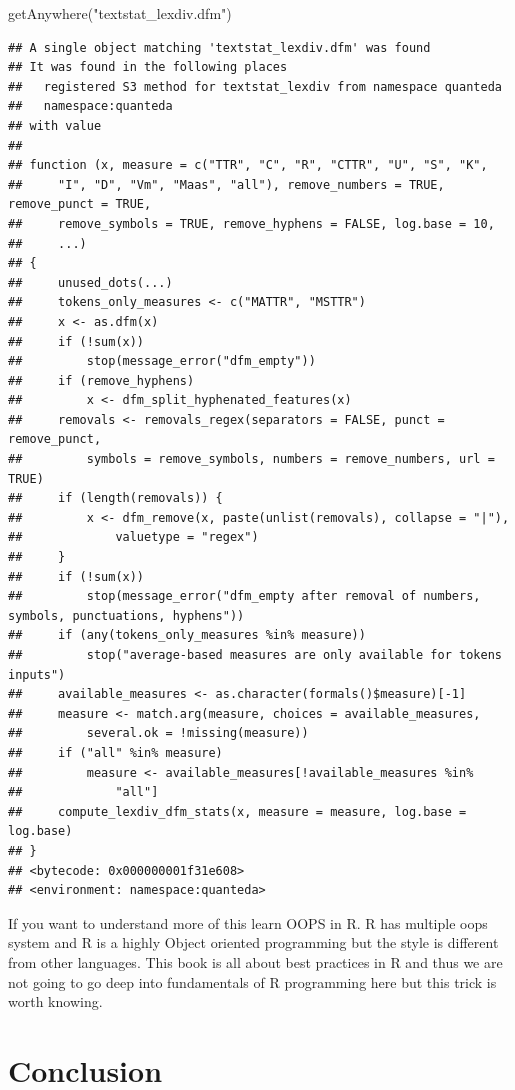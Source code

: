 \documentclass[
]{book}
\newenvironment{Shaded}{\begin{snugshade}}{\end{snugshade}}
\newcommand{\FunctionTok}[1]{\textcolor[rgb]{0.00,0.00,0.00}{#1}}
\newcommand{\NormalTok}[1]{#1}
\newcommand{\StringTok}[1]{\textcolor[rgb]{0.31,0.60,0.02}{#1}}
\begin{document}
\begin{Shaded}
\begin{Highlighting}[]
\FunctionTok{getAnywhere}\NormalTok{(}\StringTok{"textstat\_lexdiv.dfm"}\NormalTok{)}
\end{Highlighting}
\end{Shaded}

\begin{verbatim}
## A single object matching 'textstat_lexdiv.dfm' was found
## It was found in the following places
##   registered S3 method for textstat_lexdiv from namespace quanteda
##   namespace:quanteda
## with value
## 
## function (x, measure = c("TTR", "C", "R", "CTTR", "U", "S", "K", 
##     "I", "D", "Vm", "Maas", "all"), remove_numbers = TRUE, remove_punct = TRUE, 
##     remove_symbols = TRUE, remove_hyphens = FALSE, log.base = 10, 
##     ...) 
## {
##     unused_dots(...)
##     tokens_only_measures <- c("MATTR", "MSTTR")
##     x <- as.dfm(x)
##     if (!sum(x)) 
##         stop(message_error("dfm_empty"))
##     if (remove_hyphens) 
##         x <- dfm_split_hyphenated_features(x)
##     removals <- removals_regex(separators = FALSE, punct = remove_punct, 
##         symbols = remove_symbols, numbers = remove_numbers, url = TRUE)
##     if (length(removals)) {
##         x <- dfm_remove(x, paste(unlist(removals), collapse = "|"), 
##             valuetype = "regex")
##     }
##     if (!sum(x)) 
##         stop(message_error("dfm_empty after removal of numbers, symbols, punctuations, hyphens"))
##     if (any(tokens_only_measures %in% measure)) 
##         stop("average-based measures are only available for tokens inputs")
##     available_measures <- as.character(formals()$measure)[-1]
##     measure <- match.arg(measure, choices = available_measures, 
##         several.ok = !missing(measure))
##     if ("all" %in% measure) 
##         measure <- available_measures[!available_measures %in% 
##             "all"]
##     compute_lexdiv_dfm_stats(x, measure = measure, log.base = log.base)
## }
## <bytecode: 0x000000001f31e608>
## <environment: namespace:quanteda>
\end{verbatim}

If you want to understand more of this learn OOPS in R. R has multiple oops system and R is a highly Object oriented programming but the style is different from other languages. This book is all about best practices in R and thus we are not going to go deep into fundamentals of R programming here but this trick is worth knowing.

\hypertarget{conclusion-2}{%
\section{Conclusion}\label{conclusion-2}}
\end{document}
